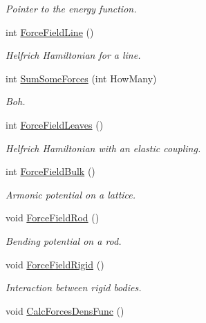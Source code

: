 \begin{DoxyCompactItemize}
\begin{DoxyCompactList}\small\item\em \-Pointer to the energy function. \end{DoxyCompactList}\item 
int \hyperlink{classForces_abe46a6cf819d53f35747565f9276854f}{\-Force\-Field\-Line} ()
\begin{DoxyCompactList}\small\item\em \-Helfrich \-Hamiltonian for a line. \end{DoxyCompactList}\item 
\hypertarget{classForces_aad7c51f4a67ea41983881db33d1e5434}{int \hyperlink{classForces_aad7c51f4a67ea41983881db33d1e5434}{\-Sum\-Some\-Forces} (int \-How\-Many)}\label{classForces_aad7c51f4a67ea41983881db33d1e5434}

\begin{DoxyCompactList}\small\item\em \-Boh. \end{DoxyCompactList}\item 
int \hyperlink{classForces_aed97e42cbfeb918574e91a90719864ab}{\-Force\-Field\-Leaves} ()
\begin{DoxyCompactList}\small\item\em \-Helfrich \-Hamiltonian with an elastic coupling. \end{DoxyCompactList}\item 
int \hyperlink{classForces_aa57796d41906bf35c6a79225ecda6f98}{\-Force\-Field\-Bulk} ()
\begin{DoxyCompactList}\small\item\em \-Armonic potential on a lattice. \end{DoxyCompactList}\item 
void \hyperlink{classForces_ae35380222f8a3cacfa4a4df6d1742ffb}{\-Force\-Field\-Rod} ()
\begin{DoxyCompactList}\small\item\em \-Bending potential on a rod. \end{DoxyCompactList}\item 
\hypertarget{classForces_a8f12492ed75d05c816d8f14bbeaf71be}{void \hyperlink{classForces_a8f12492ed75d05c816d8f14bbeaf71be}{\-Force\-Field\-Rigid} ()}\label{classForces_a8f12492ed75d05c816d8f14bbeaf71be}

\begin{DoxyCompactList}\small\item\em \-Interaction between rigid bodies. \end{DoxyCompactList}\item 
\hypertarget{classForces_a5c32ef207ba714e72e72de3063860b39}{void \hyperlink{classForces_a5c32ef207ba714e72e72de3063860b39}{\-Calc\-Forces\-Dens\-Func} ()}\label{classForces_a5c32ef207ba714e72e72de3063860b39}


\end{DoxyCompactItemize}
